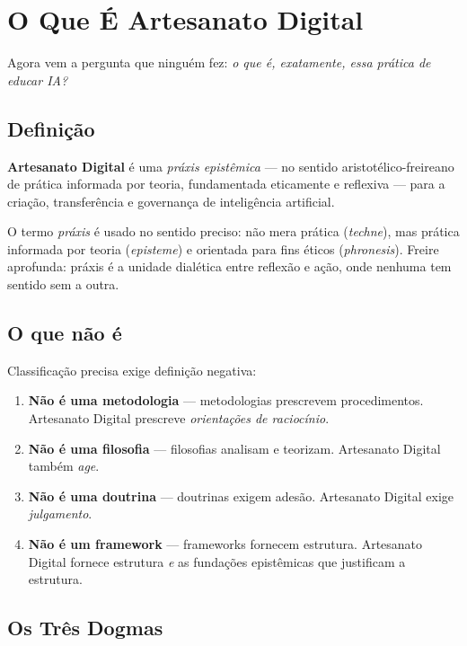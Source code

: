 \documentclass[12pt,a4paper]{article}
\begin{document}
\section{O Que É Artesanato Digital}
\label{sec:artesanato}

Agora vem a pergunta que ninguém fez: \emph{o que é, exatamente, essa prática de educar IA?}

\subsection{Definição}

\textbf{Artesanato Digital} é uma \emph{práxis epistêmica} --- no sentido aristotélico-freireano de prática informada por teoria, fundamentada eticamente e reflexiva --- para a criação, transferência e governança de inteligência artificial.

O termo \emph{práxis} é usado no sentido preciso: não mera prática (\emph{techne}), mas prática informada por teoria (\emph{episteme}) e orientada para fins éticos (\emph{phronesis}). Freire aprofunda: práxis é a unidade dialética entre reflexão e ação, onde nenhuma tem sentido sem a outra.

\subsection{O que não é}

Classificação precisa exige definição negativa:

\begin{enumerate}
  \item \textbf{Não é uma metodologia} --- metodologias prescrevem procedimentos. Artesanato Digital prescreve \emph{orientações de raciocínio}.
  \item \textbf{Não é uma filosofia} --- filosofias analisam e teorizam. Artesanato Digital também \emph{age}.
  \item \textbf{Não é uma doutrina} --- doutrinas exigem adesão. Artesanato Digital exige \emph{julgamento}.
  \item \textbf{Não é um framework} --- frameworks fornecem estrutura. Artesanato Digital fornece estrutura \emph{e} as fundações epistêmicas que justificam a estrutura.
\end{enumerate}

\subsection{Os Três Dogmas}
\end{document}
